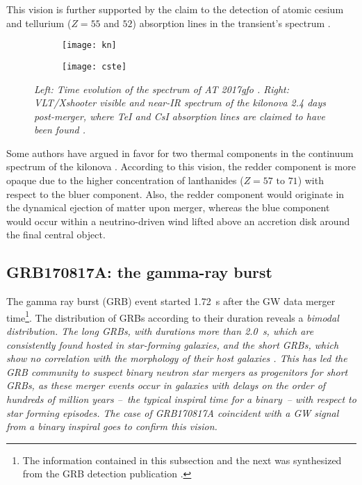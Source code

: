 This vision is further supported by the claim to the detection of atomic cesium and tellurium ($Z = 55$ and $52$) absorption lines in the transient's spectrum \citep{53}.

\begin{figure}
    \centering
    \begin{subfigure}
        \centering
        \texttt{[image: kn]}
    \end{subfigure}
    \begin{subfigure}
        \centering
        \texttt{[image: cste]}
    \end{subfigure}
    \caption[Spectra of AT 2017gfo]{\it{Left:} Time evolution of the spectrum of AT 2017gfo \citep{38}. \it{Right:} VLT/Xshooter visible and near-IR spectrum of the kilonova 2.4 days post-merger, where TeI and CsI absorption lines are claimed to have been found \citep{53}.}
    \label{kn}
\end{figure}

Some authors have argued in favor for two thermal components in the continuum spectrum of the kilonova \citep{57}. According to this vision, the redder component is more opaque due to the higher concentration of lanthanides ($Z = 57 \text{ to } 71$) with respect to the bluer component. Also, the redder component would originate in the dynamical ejection of matter upon merger, whereas the blue component would occur within a neutrino-driven wind lifted above an accretion disk around the final central object.


\subsection{GRB170817A: the gamma-ray burst}
The gamma ray burst (GRB) event started 1.72~s after the GW data merger time\footnote{The information contained in this subsection and the next was synthesized from the GRB detection publication \citep{52}.}. The distribution of GRBs according to their duration reveals a \it{bimodal distribution}. The \it{long} GRBs, with durations more than 2.0~s, which are consistently found hosted in star-forming galaxies, and the \it{short} GRBs, which show no correlation with the morphology of their host galaxies \citep[see][for a review]{28}. This has led the GRB community to suspect binary neutron star mergers as progenitors for short GRBs, as these merger events occur in galaxies with delays on the order of hundreds of million years --~the typical inspiral time for a binary~-- with respect to star forming episodes. The case of GRB170817A coincident with a GW signal from a binary inspiral goes to confirm this vision.

